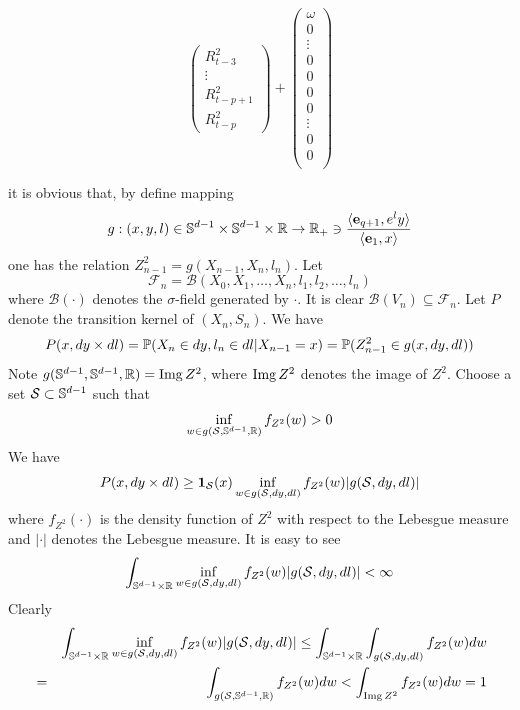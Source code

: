 \begin{tiny}
\begin{equation}
\begin{pmatrix}
      R_{t-3}^2 \\
      \vdots \\
      R_{t-p+1}^2 \\
      R_{t-p}^2
    \end{pmatrix}
    +
    \begin{pmatrix}
      \omega \\
      0 \\
      \vdots \\
      0 \\
      0 \\
      0 \\
      0 \\
      \vdots \\
      0 \\
      0 \\
    \end{pmatrix}
  \end{equation}
\end{tiny}
it is obvious that, by define mapping
\[
g: (x, y, l) \in \sphere^{d-1} \times \sphere^{d-1} \times \reals
\to
\reals_+ \ni {
  \inn{\vec e_{q+1}, e^l y}
  \over
  \inn{\vec e_{1}, x}
}
\]
one has the relation $Z_{n-1}^2 = g(X_{n-1}, X_n, l_n)$. Let
\[
\mathcal F_n = \mathcal B(X_0, X_1, \dots, X_n, l_1, l_2, \dots, l_n)
\]
where $\mathcal B(\cdot)$ denotes the $\sigma$-field generated by
$\cdot$. It is clear $\mathcal B(V_n) \subseteq \mathcal F_n$.
Let $P$ denote the transition kernel of $(X_n, S_n)$. We have
\[
  P(x, dy \times dl) = \P(X_n \in dy, l_n \in dl | X_{n-1} = x)
  = \P(Z_{n-1}^2 \in g(x, dy, dl))
  \]
Note $g(\sphere^{d-1}, \sphere^{d-1}, \reals) = \img Z^2$,
where $\img Z^2$ denotes the image of $Z^2$.
Choose a set $\mathcal S \subset \sphere^{d-1}$ such that
\[
\inf_{w \in g(\mathcal S, \sphere^{d-1}, \reals)} f_{Z^2}(w) > 0
\]
We have
\begin{eqnarray*}
  P(x, dy \times dl) \geq
  \I_{\mathcal S}(x) \inf_{w \in g(\mathcal S, dy, dl)} f_{Z^2}(w)
  | g(\mathcal S, dy, dl)| 
\end{eqnarray*}
where $f_{Z^2}(\cdot)$ is the density function of $Z^2$ with respect to the
Lebesgue measure and $|\cdot|$ denotes the Lebesgue measure. It is
easy to see
\[
\int_{\sphere^{d-1} \times \reals} \inf_{w \in g(\mathcal S, dy, dl)} f_{Z^2}(w)
| g(\mathcal S, dy, dl)| < \infty
\]
Clearly
\begin{eqnarray*}
  &&
  \int_{\sphere^{d-1} \times \reals} \inf_{w \in g(\mathcal S, dy, dl)} f_{Z^2}(w)
  | g(\mathcal S, dy, dl)|
  \leq
  \int_{\sphere^{d-1} \times \reals}
  \int_{g(\mathcal S, dy, dl)} f_{Z^2}(w) dw \\
  &=&
  \int_{g(\mathcal S, \sphere^{d-1}, \reals)} f_{Z^2}(w) dw
  <
  \int_{\img Z^2} f_{Z^2}(w) dw = 1
\end{eqnarray*}
